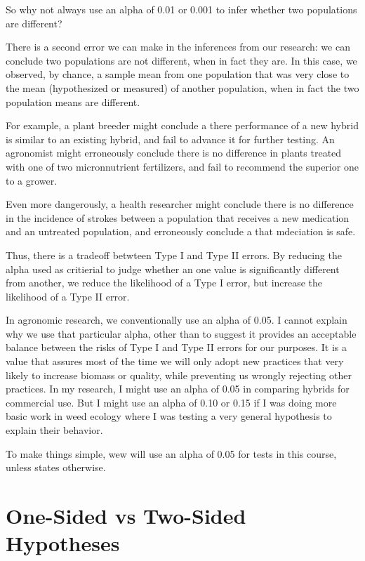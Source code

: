 \documentclass[
]{book}
\begin{document}
So why not always use an alpha of 0.01 or 0.001 to infer whether two populations are different?

There is a second error we can make in the inferences from our research: we can conclude two populations are not different, when in fact they are. In this case, we observed, by chance, a sample mean from one population that was very close to the mean (hypothesized or measured) of another population, when in fact the two population means are different.

For example, a plant breeder might conclude a there performance of a new hybrid is similar to an existing hybrid, and fail to advance it for further testing. An agronomist might erroneously conclude there is no difference in plants treated with one of two micronnutrient fertilizers, and fail to recommend the superior one to a grower.

Even more dangerously, a health researcher might conclude there is no difference in the incidence of strokes between a population that receives a new medication and an untreated population, and erroneously conclude a that mdeciation is safe.

Thus, there is a tradeoff betwteen Type I and Type II errors. By reducing the alpha used as critierial to judge whether an one value is significantly different from another, we reduce the likelihood of a Type I error, but increase the likelihood of a Type II error.

In agronomic research, we conventionally use an alpha of 0.05. I cannot explain why we use that particular alpha, other than to suggest it provides an acceptable balance between the risks of Type I and Type II errors for our purposes. It is a value that assures most of the time we will only adopt new practices that very likely to increase biomass or quality, while preventing us wrongly rejecting other practices. In my research, I might use an alpha of 0.05 in comparing hybrids for commercial use. But I might use an alpha of 0.10 or 0.15 if I was doing more basic work in weed ecology where I was testing a very general hypothesis to explain their behavior.

To make things simple, wew will use an alpha of 0.05 for tests in this course, unless states otherwise.

\hypertarget{one-sided-vs-two-sided-hypotheses}{%
\section{One-Sided vs Two-Sided Hypotheses}\label{one-sided-vs-two-sided-hypotheses}}
\end{document}
